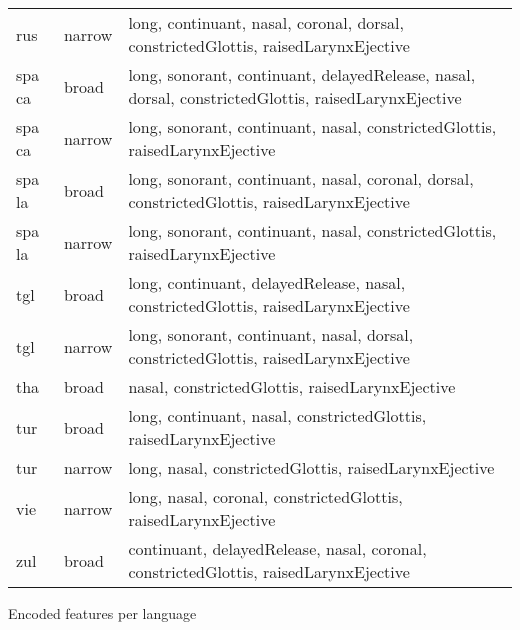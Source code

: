 {\begin{tabularx}{1.2\textwidth}{|llX|}
rus                & narrow        & long, continuant, nasal, coronal, dorsal, constrictedGlottis, raisedLarynxEjective                                                 \\
spa ca             & broad         & long, sonorant, continuant, delayedRelease, nasal, dorsal, constrictedGlottis, raisedLarynxEjective                                \\
spa ca             & narrow        & long, sonorant, continuant, nasal, constrictedGlottis, raisedLarynxEjective                                                        \\
spa la             & broad         & long, sonorant, continuant, nasal, coronal, dorsal, constrictedGlottis, raisedLarynxEjective                                       \\
spa la             & narrow        & long, sonorant, continuant, nasal, constrictedGlottis, raisedLarynxEjective                                                        \\
tgl                & broad         & long, continuant, delayedRelease, nasal, constrictedGlottis, raisedLarynxEjective                                                  \\
tgl                & narrow        & long, sonorant, continuant, nasal, dorsal, constrictedGlottis, raisedLarynxEjective                                                \\
tha                & broad         & nasal, constrictedGlottis, raisedLarynxEjective                                                                                    \\
tur                & broad         & long, continuant, nasal, constrictedGlottis, raisedLarynxEjective                                                                  \\
tur                & narrow        & long, nasal, constrictedGlottis, raisedLarynxEjective                                                                              \\
vie                & narrow        & long, nasal, coronal, constrictedGlottis, raisedLarynxEjective                                                                     \\
zul                & broad         & continuant, delayedRelease, nasal, coronal, constrictedGlottis, raisedLarynxEjective  \\
\hline                                            
\end{tabularx}
\vspace{-0.2cm}
}{Encoded features per language}



